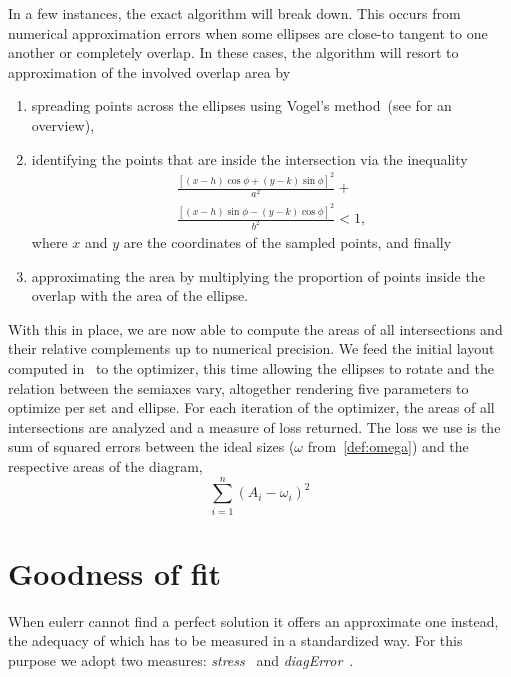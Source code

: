 \documentclass[
  oneside,
  openany,
  numbers=noendperiod,
  parskip=half,
  bibliography=totoc
]{scrbook}\usepackage[]{graphicx}\usepackage{xcolor}
\newcommand{\pkg}[1]{{\fontseries{b}\selectfont #1}}
\begin{document}
In a few instances,
the exact algorithm will break down. This occurs from numerical approximation
errors when some ellipses are close-to tangent to one another or completely
overlap. In these cases, the algorithm will resort to approximation of the
involved overlap area by
\begin{enumerate}
\item spreading points across the ellipses using Vogel's
  method~(see  for an overview),
\item identifying the points that are inside the intersection via the inequality
  \begin{equation*}
  \begin{multlined}
  \frac{\left[ (x-h)\cos{\phi}+(y-k)\sin{\phi} \right]^2}{a^2} + \\
    \frac{\left[(x-h) \sin{\phi}-(y-k)\cos{\phi}\right]^2}{b^2} < 1,
  \end{multlined}
  \end{equation*}
  where $x$ and $y$ are the coordinates of the sampled points, and finally
\item approximating the area by multiplying the proportion of points inside the
  overlap with the area of the ellipse.
\end{enumerate}

With this in place, we are now able to compute the areas of all intersections
and their relative complements up to numerical precision. We feed the initial
layout computed in~ to the optimizer, this time allowing
the ellipses to rotate and the relation between the semiaxes vary, altogether
rendering five parameters to optimize per set and ellipse. For each iteration of
the optimizer, the areas of all intersections are analyzed and a measure of loss
returned. The loss we use is the sum of squared errors between the ideal sizes
($\omega$ from~\cref{def:omega}) and the respective areas of the diagram,
\begin{equation}
\sum_{i=1}^{n}  (A_i-\omega_i)^2
\label{eq:loss}
\end{equation}

\section{Goodness of fit}
\label{sec:gof}

When \pkg{eulerr} cannot find a perfect solution it offers an approximate one
instead, the adequacy of which has to be measured in a standardized way. For
this purpose we adopt two measures: \emph{stress}~\citep{wilkinson_2012} and
\emph{diagError}~\citep{micallef_2014}.
\end{document}
